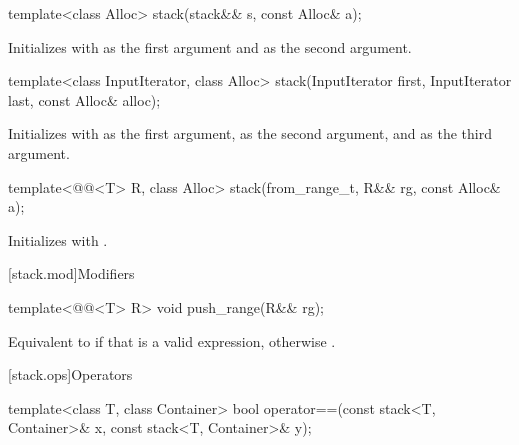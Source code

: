 %
\begin{itemdecl}
template<class Alloc> stack(stack&& s, const Alloc& a);
\end{itemdecl}

\begin{itemdescr}
\pnum
\effects
Initializes  with  as the first argument and 
as the second argument.
\end{itemdescr}

%
\begin{itemdecl}
template<class InputIterator, class Alloc>
  stack(InputIterator first, InputIterator last, const Alloc& alloc);
\end{itemdecl}

\begin{itemdescr}
\pnum
\effects
Initializes  with
 as the first argument,
 as the second argument, and
 as the third argument.
\end{itemdescr}

%
\begin{itemdecl}
template<@@<T> R, class Alloc>
  stack(from_range_t, R&& rg, const Alloc& a);
\end{itemdecl}

\begin{itemdescr}
\pnum
\effects
Initializes
 with .
\end{itemdescr}

[stack.mod]{Modifiers}

%
\begin{itemdecl}
template<@@<T> R>
  void push_range(R&& rg);
\end{itemdecl}

\begin{itemdescr}
\pnum
\effects
Equivalent to 
if that is a valid expression,
otherwise .
\end{itemdescr}

[stack.ops]{Operators}

%
\begin{itemdecl}
template<class T, class Container>
  bool operator==(const stack<T, Container>& x, const stack<T, Container>& y);
\end{itemdecl}

